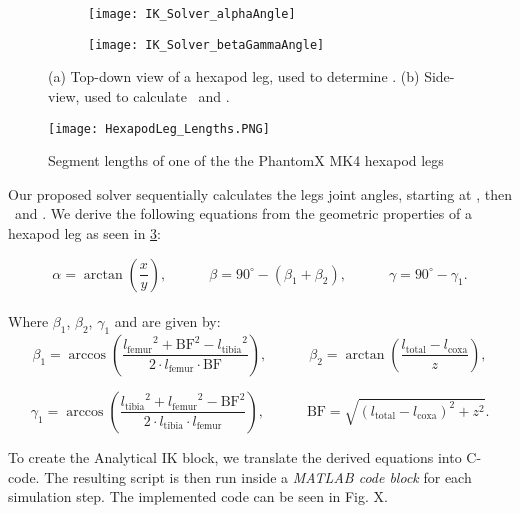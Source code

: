 \begin{figure}[!h]
	\begin{subfigure}{.5\textwidth} %
		\centering
		\texttt{[image: IK\_Solver\_alphaAngle]}  %
		\caption{}
		\label{figure: IK Solver Alpha Angle}
	\end{subfigure}
	\begin{subfigure}{.5\textwidth}
		\centering
		\texttt{[image: IK\_Solver\_betaGammaAngle]}  
		\caption{}
		\label{figure: IK Solver Beta/Gamma Angle}
	\end{subfigure}
	\caption[Angle derivation drawings]{(a) Top-down view of a hexapod leg, used to determine \textalpha. (b) Side-view, used to calculate \textbeta \ and \textgamma.}
	\label{figure: IK angle derivations}
\end{figure}

\begin{figure}[!h]
	\centerline{\texttt{[image: HexapodLeg\_Lengths.PNG]}}
	\caption[Hexapod leg segment lengths]{Segment lengths of one of the the PhantomX MK4 hexapod legs}
	\label{figure: Hexapod Leg Lengths}
\end{figure}

Our proposed solver sequentially calculates the legs joint angles, starting at \textalpha, then \textbeta \ and \textgamma.
We derive the following equations from the geometric properties of a hexapod leg as seen in \ref{figure: IK angle derivations}:

\[
	\alpha = \arctan(\frac{x}{y}) ,\quad \quad \quad \beta = 90^{\circ} - (\beta_1 + \beta_2) ,\quad \quad \quad \gamma = 90^{\circ} - \gamma_1.
\]
\\
Where $\beta_1$, $\beta_2$, $\gamma_1$ and  are given by:
\[	
	\beta_1 = \arccos(\frac{{l_\text{femur}}^2 + \text{BF}^2 - {l_\text{tibia}}^2}  {2\cdot l_\text{femur} \cdot \text{BF}}) ,\quad \quad \quad \beta_2 = \arctan(\frac{ l_\text{total} - l_\text{coxa}} {z}),
\]

\[
	\gamma_1 = \arccos(\frac{{l_\text{tibia}}^2 + {l_\text{femur}}^2 - {\text{BF}}^2}  {2 \cdot {l_\text{tibia}} \cdot {l_\text{femur}}}) ,\quad \quad \quad \text{BF} = \sqrt{(l_\text{total} - l_\text{coxa})^2 + z^2}.
\]

To create the Analytical IK block, we translate the derived equations into C-code.
The resulting script is then run inside a \textit{MATLAB code block} for each simulation step.
The implemented code can be seen in Fig. X. 



